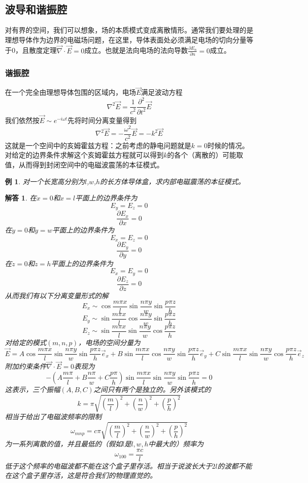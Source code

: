 \documentclass[a4paper,11pt]{ctexart}
\newtheorem{eg}{例}[section]
\newtheorem{ans}{解答}[section]
\newcommand{\beq}{\begin{equation}}
\newcommand{\eeq}{\end{equation}}
\newcommand{\del}{\vec{\nabla}}
\newcommand{\pfrac}[2]{\frac{\partial #1}{\partial #2}}
\begin{document}
\subsection{波导和谐振腔}
对有界的空间，我们可以想象，场的本质模式变成离散情形。通常我们要处理的是理想导体作为边界的电磁场问题，在这里，导体表面处必须满足电场的切向分量等于0，且散度定理$\del \cdot \vec E=0$成立。也就是法向电场的法向导数$\pfrac{E_n}{n}=0$成立。
\subsubsection{谐振腔}
在一个完全由理想导体包围的区域内，电场$\vec E$满足波动方程
\beq
\nabla^2 \vec E = \frac{1}{c^2} \pfrac{^2}{ t^2} \vec E
\eeq
我们依然按$\vec E \sim e^{-i\omega t}$先将时间分离变量得到
\beq
\nabla^2 \vec E = - \frac{\omega^2}{c^2} \vec E = -k^2 \vec E
\eeq
这就是一个空间中的亥姆霍兹方程：之前考虑的静电问题就是$k=0$时候的情况。对给定的边界条件求解这个亥姆霍兹方程就可以得到$k$的各个（离散的）可能取值，从而得到封闭空间中的电磁波震荡的本征模式。
\begin{eg}
对一个长宽高分别为$l$,$w$,$h$的长方体导体盒，求内部电磁震荡的本征模式。
\end{eg}
\begin{ans}
在$x=0$和$x=l$平面上的边界条件为
\beq
E_y = E_z = 0
\eeq
\beq
\pfrac{E_x}{x} = 0
\eeq
在$y=0$和$y=w$平面上的边界条件为
\beq
E_x = E_z = 0
\eeq
\beq
\pfrac{E_y}{y} = 0
\eeq
在$z=0$和$z=h$平面上的边界条件为
\beq
E_x = E_y = 0
\eeq
\beq
\pfrac{E_z}{z} = 0
\eeq
从而我们有以下分离变量形式的解
\beq
E_x \sim \cos \frac{m\pi x}{l} \sin \frac{n\pi y}{w} \sin \frac{p\pi z}{h}
\eeq
\beq
E_y \sim \sin \frac{m \pi x}{l} \cos \frac{n \pi y}{w} \sin \frac{p \pi z}{h}
\eeq
\beq
E_z \sim \sin \frac{m \pi x}{l} \sin \frac{n\pi y}{w} \cos \frac{p \pi z}{h}
\eeq
对给定的模式$(m,n,p)$，电场的空间分量为
\beq
\vec E = A \cos \frac{m\pi x}{l} \sin \frac{n\pi y}{w} \sin \frac{p\pi z}{h} \vec{e}_x + B \sin \frac{m \pi x}{l} \cos \frac{n \pi y}{w} \sin \frac{p \pi z}{h} \vec{e}_y + C  \sin \frac{m \pi x}{l} \sin \frac{n\pi y}{w} \cos \frac{p \pi z}{h}\vec{e}_z
\eeq
附加约束条件$\del \cdot \vec E=0$表现为
\beq
-\left(A \frac{m\pi}{l} + B \frac{n\pi}{w} + C \frac{p\pi}{h}\right)\sin \frac{m\pi x}{l} \sin \frac{n\pi y}{w} \sin \frac{p\pi z}{h}=0
\eeq
这表示，三个振幅$(A,B,C)$之间只有两个是独立的。另外该模式的
\beq
k= \pi \sqrt{\left(\frac{m}{l}\right)^2+\left(\frac{n}{w}\right)^2 + \left(\frac{p}{h}\right)^2}
\eeq
相当于给出了电磁波频率的限制
\beq
\omega_{mnp} = c\pi\sqrt{\left(\frac{m}{l}\right)^2+\left(\frac{n}{w}\right)^2 + \left(\frac{p}{h}\right)^2}
\eeq
为一系列离散的值，并且最低的（假如$l$是$l,w,h$中最大的）频率为
\beq
\omega_{100} = \frac{\pi c}{l}
\eeq
低于这个频率的电磁波都不能在这个盒子里存活。相当于说波长大于$2l$的波都不能在这个盒子里存活，这是符合我们的物理直觉的。

\end{ans}
\end{document}
